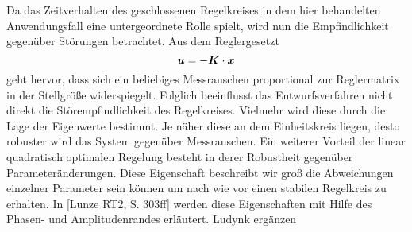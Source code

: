 Da das Zeitverhalten des geschlossenen Regelkreises in dem hier behandelten Anwendungsfall eine untergeordnete Rolle spielt, wird nun die Empfindlichkeit gegenüber Störungen betrachtet. Aus dem Reglergesetzt
\begin{equation}
\boldsymbol{u} = -\boldsymbol{K}\cdot\boldsymbol{x}
\end{equation}
geht hervor, dass sich ein beliebiges Messrauschen proportional zur Reglermatrix in der Stellgröße widerspiegelt. Folglich beeinflusst das Entwurfsverfahren nicht direkt die Störempfindlichkeit des Regelkreises. Vielmehr wird diese durch die Lage der Eigenwerte bestimmt. Je näher diese an dem Einheitskreis liegen, desto robuster wird das System gegenüber Messrauschen.
Ein weiterer Vorteil der linear quadratisch optimalen Regelung besteht in derer Robustheit gegenüber Parameteränderungen. Diese Eigenschaft beschreibt wir groß die Abweichungen einzelner Parameter sein können um nach wie vor einen stabilen Regelkreis zu erhalten. In [Lunze RT2, S. 303ff] werden diese Eigenschaften mit Hilfe des Phasen- und Amplitudenrandes erläutert. Ludynk ergänzen
